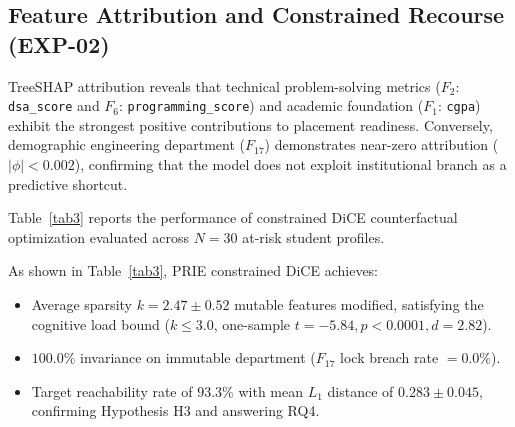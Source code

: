 \documentclass[conference]{IEEEtran}
\begin{document}
\subsection{Feature Attribution and Constrained Recourse (EXP-02)}

TreeSHAP attribution reveals that technical problem-solving metrics ($F_2$: \texttt{dsa\_score} and $F_6$: \texttt{programming\_score}) and academic foundation ($F_1$: \texttt{cgpa}) exhibit the strongest positive contributions to placement readiness. Conversely, demographic engineering department ($F_{17}$) demonstrates near-zero attribution ($|\phi| < 0.002$), confirming that the model does not exploit institutional branch as a predictive shortcut.

Table~\ref{tab3} reports the performance of constrained DiCE counterfactual optimization evaluated across $N=30$ at-risk student profiles.

\begin{table}[htbp]
\caption{Prescriptive Counterfactual Recourse Optimization ($N=30$ Profiles)}
\begin{center}
\label{tab3}
\end{center}
\end{table}

As shown in Table~\ref{tab3}, PRIE constrained DiCE achieves:
\begin{itemize}
\item Average sparsity $k = 2.47 \pm 0.52$ mutable features modified, satisfying the cognitive load bound ($k \le 3.0$, one-sample $t = -5.84, p < 0.0001, d = 2.82$).
\item $100.0\%$ invariance on immutable department ($F_{17}$ lock breach rate $= 0.0\%$).
\item Target reachability rate of $93.3\%$ with mean $L_1$ distance of $0.283 \pm 0.045$, confirming Hypothesis H3 and answering RQ4.
\end{itemize}
\end{document}
